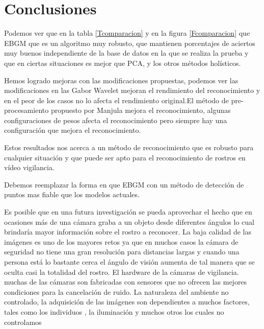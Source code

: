 \chapter{Conclusiones }\label{chap:conclusiones}

Podemos ver que en la tabla \ref{Tcomparacion} y en la figura \ref{Fcomparacion} que \ac{EBGM} que es un algoritmo muy robusto, que mantienen porcentajes de aciertos muy buenos independiente de la base de datos en la que se realiza la prueba y que en ciertas situaciones es mejor que \ac{PCA}, y los otros métodos holísticos.

Hemos logrado mejoras con las modificaciones propuestas, podemos ver las modificaciones en las Gabor Wavelet mejoran el rendimiento del reconocimiento y en el peor de los casos no lo afecta el rendimiento original.El método de pre-procesamiento propuesto por Manjula\cite{manjulaimage} mejora el reconocimiento, algunas configuraciones de pesos afecta el reconocimiento pero siempre hay una configuración que mejora el reconocimiento.

Estos resultados nos acerca a un método de reconocimiento que es robusto para cualquier situación y que puede ser apto para el reconocimiento de rostros en vídeo vigilancia.

Debemos reemplazar la forma en que \ac{EBGM} con un método de detección de puntos mas fiable que los modelos actuales.

Es posible que en una futura investigación se pueda aprovechar el hecho que en ocasiones más de una cámara graba a un objeto desde diferentes ángulos lo cual brindaría mayor información sobre el rostro a reconocer.
La baja calidad de las imágenes es uno de los mayores retos ya que en muchos casos la cámara de seguridad no tiene una gran resolución para distancias largas y cuando una persona está lo bastante cerca el ángulo de visión aumenta de tal manera que se oculta casi la totalidad del rostro.
El hardware de la cámaras de vigilancia. muchas de las cámaras son fabricadas con sensores que no ofrecen las mejores condiciones para la cancelación de ruido. 
La naturaleza del ambiente no controlado, la adquisición de las imágenes son dependientes a muchos factores, tales como los individuos , la iluminación y muchos otros los cuales no controlamos

